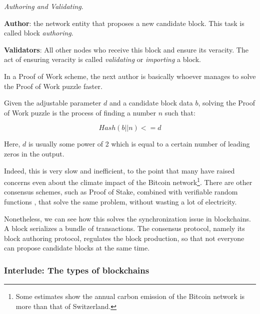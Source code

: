 \begin{definition} \label{def:auhtor_validator}

	\textit{Authoring and Validating}.

	\textbf{Author}: the network entity that proposes a new candidate block. This task is called
	block \textit{authoring}.

	\textbf{Validators}: All other nodes who receive this block and ensure its veracity. The act of
	ensuring veracity is called \textit{validating} or \textit{importing} a block.
\end{definition}

In a Proof of Work scheme, the next author is basically whoever manages to solve the Proof of Work
puzzle faster.

\begin{definition} \label{def:pow} Given the adjustable parameter $d$ and a candidate block data
$b$, solving the Proof of Work puzzle is the process of finding a number $n$ such that:

	\begin{equation}
		Hash(b || n) <= d
	\end{equation}

Here, $d$ is usually some power of 2 which is equal to a certain number of leading zeros in the
output.
\end{definition}

Indeed, this is very slow and inefficient, to the point that many have raised concerns even about
the climate impact of the Bitcoin network\footnote{Some estimates show the annual carbon emission of
the Bitcoin network is more than that of Switzerland\cite{stollCarbonFootprintBitcoin2019}.}. There
are other consensus schemes, such as Proof of Stake, combined with verifiable random functions
\cite{dodisVerifiableRandomFunction2005}, that solve the same problem, without wasting a lot of
electricity.

Nonetheless, we can see how this solves the synchronization issue in blockchains. A block serializes
a bundle of transactions. The consensus protocol, namely its block authoring protocol, regulates the
block production, so that not everyone can propose candidate blocks at the same time.

\subsubsection{Interlude: The types of blockchains} \label{chap_bg:subsec:blockchain_types}

